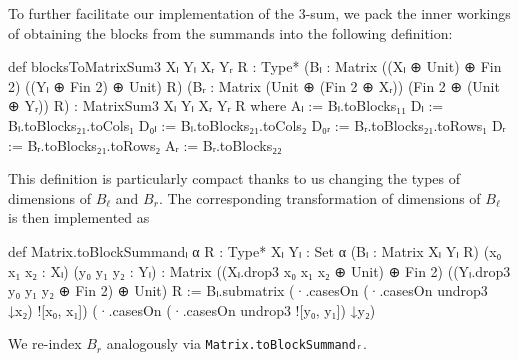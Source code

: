 To further facilitate our implementation of the 3-sum, we pack the inner workings of obtaining the blocks from the summands into the following definition:
\begin{leancode}
def blocksToMatrixSum3 {Xₗ Yₗ Xᵣ Yᵣ R : Type*}
    (Bₗ : Matrix ((Xₗ ⊕ Unit) ⊕ Fin 2)
                 ((Yₗ ⊕ Fin 2) ⊕ Unit) R)
    (Bᵣ : Matrix (Unit ⊕ (Fin 2 ⊕ Xᵣ))
                 (Fin 2 ⊕ (Unit ⊕ Yᵣ)) R) :
    MatrixSum3 Xₗ Yₗ Xᵣ Yᵣ R where
  Aₗ := Bₗ.toBlocks₁₁
  Dₗ := Bₗ.toBlocks₂₁.toCols₁
  D₀ₗ := Bₗ.toBlocks₂₁.toCols₂
  D₀ᵣ := Bᵣ.toBlocks₂₁.toRows₁
  Dᵣ := Bᵣ.toBlocks₂₁.toRows₂
  Aᵣ := Bᵣ.toBlocks₂₂
\end{leancode}
This definition is particularly compact thanks to us changing the types of dimensions of $B_{\ell}$ and $B_{r}$. The corresponding transformation of dimensions of $B_{\ell}$ is then implemented as
\begin{leancode}
def Matrix.toBlockSummandₗ {α R : Type*}
    {Xₗ Yₗ : Set α} (Bₗ : Matrix Xₗ Yₗ R)
    (x₀ x₁ x₂ : Xₗ) (y₀ y₁ y₂ : Yₗ) :
    Matrix
      ((Xₗ.drop3 x₀ x₁ x₂ ⊕ Unit) ⊕ Fin 2)
      ((Yₗ.drop3 y₀ y₁ y₂ ⊕ Fin 2) ⊕ Unit)
      R :=
  Bₗ.submatrix
    (·.casesOn (·.casesOn undrop3 ↓x₂) ![x₀, x₁])
    (·.casesOn (·.casesOn undrop3 ![y₀, y₁]) ↓y₂)
\end{leancode}
We re-index $B_{r}$ analogously via \texttt{Matrix.toBlockSummandᵣ}.

